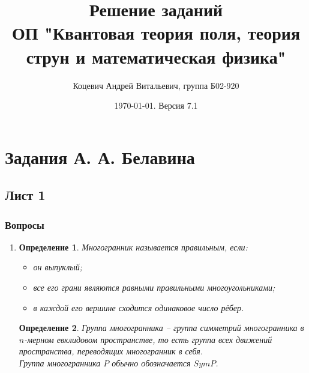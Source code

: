 \documentclass[12pt]{article}
\title{Решение заданий\\ ОП "Квантовая теория поля, теория струн и математическая физика"}
\author{Коцевич Андрей Витальевич, группа Б02-920}
\date{\today. Версия 7.1}
\newtheorem{definition}{Определение}
\begin{document}
\maketitle
\newpage
\newpage
\tableofcontents{}
\newpage
\section{Задания А. А. Белавина}
\subsection{Лист 1}
\subsubsection{Вопросы}
\begin{enumerate}
    \item \begin{definition}
    Многогранник называется правильным, если:
    \begin{itemize}
        \item он выпуклый;
        \item все его грани являются равными правильными многоугольниками;
        \item в каждой его вершине сходится одинаковое число рёбер.
    \end{itemize}
    \end{definition}
    \begin{definition}
    Группа многогранника -- группа симметрий многогранника в $n$-мерном евклидовом пространстве, то есть группа всех движений пространства, переводящих многогранник в себя.\\
    Группа многогранника $P$ обычно обозначается $SymP$.
    \end{definition}
\end{enumerate}
\end{document}
